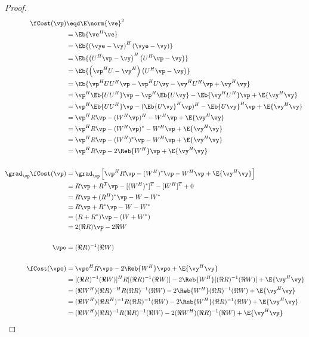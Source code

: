 {\begin{proof}
\begin{align*}
   \fCost(\vp)
     &\eqd \E \norm{\ve}^2
   \\&=    \Eb{\ve^H\ve}
   \\&=    \Eb{ \left(\vye-\vy\right)^H\left(\vye-\vy\right) }
   \\&=    \Eb{ \left(U^H\vp-\vy\right)^H\left(U^H\vp-\vy\right) }
   \\&=    \Eb{ \left(\vp^HU-\vy^H\right)\left(U^H\vp-\vy\right) }
   \\&=    \Eb{ \vp^HUU^H\vp - \vp^HU\vy -\vy^HU^H\vp + \vy^H\vy }
   \\&=    \vp^H\Eb{UU^H}\vp - \vp^H\Eb{U\vy} -\Eb{\vy^HU^H}\vp + \E{\vy^H\vy}
   \\&=    \vp^H\Eb{UU^H}\vp - (\Eb{U\vy}^H\vp)^H -\Eb{U\vy}^H\vp + \E{\vy^H\vy}
   \\&=    \vp^H R \vp - (W^H\vp)^H -W^H\vp + \E{\vy^H\vy}
   \\&=    \vp^H R \vp - (W^H\vp)^\ast -W^H\vp + \E{\vy^H\vy}
   \\&=    \vp^H R \vp - (W^H)^\ast\vp -W^H\vp + \E{\vy^H\vy}
   \\&=    \vp^H R \vp - 2\Reb{W^H}\vp + \E{\vy^H\vy}
\\
\\
   \grad_\vp \fCost(\vp)
     &= \grad_\vp \left[ \vp^H R \vp - (W^H)^\ast\vp -W^H\vp + \E{\vy^H\vy} \right]
   \\&= R\vp + R^T\vp - [(W^H)^\ast]^T - [W^H]^T + 0
   \\&= R\vp + (R^H)^\ast\vp - W - W^\ast
   \\&= R\vp + R^\ast\vp - W - W^\ast
   \\&= (R + R^\ast)\vp - (W + W^\ast)
   \\&= 2(\Re{R})\vp - 2\Re{W}
\\
\\
   \vpo
     &= (\Re{R})^{-1}(\Re{W})
\\
\\
   \fCost(\vpo)
     &=    \vpo^H R \vpo - 2\Reb{W^H}\vpo + \E{\vy^H\vy}
   \\&=    [(\Re{R})^{-1}(\Re{W})]^H R [(\Re{R})^{-1}(\Re{W})] - 2\Reb{W^H}[(\Re{R})^{-1}(\Re{W})] + \E{\vy^H\vy}
   \\&=    (\Re{W^H})(\Re{R})^{-H} R (\Re{R})^{-1}(\Re{W}) - 2\Reb{W^H}(\Re{R})^{-1}(\Re{W}) + \E{\vy^H\vy}
   \\&=    (\Re{W^H})(\Re{R^H})^{-1} R (\Re{R})^{-1}(\Re{W}) - 2\Reb{W^H}(\Re{R})^{-1}(\Re{W}) + \E{\vy^H\vy}
   \\&=    (\Re{W^H})(\Re{R})^{-1} R (\Re{R})^{-1}(\Re{W}) - 2(\Re{W^H})(\Re{R})^{-1}(\Re{W}) + \E{\vy^H\vy}

\end{align*}
\end{proof}}
